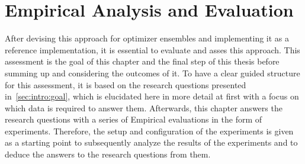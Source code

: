 %
\chapter{Empirical Analysis and Evaluation}
\label{sec:evaluation}
After devising this approach for optimizer ensembles and implementing it as a reference implementation, it is essential to evaluate and asses this approach.
This assessment is the goal of this chapter and the final step of this thesis before summing up and considering the outcomes of it.\newline
To have a clear guided structure for this assessment, it is based on the research questions presented in~\ref{sec:intro:goal}, which is elucidated here in more detail at first with a focus on which data is required to answer them.
Afterwards, this chapter answers the research questions with a series of Empirical evaluations in the form of experiments.\newline
Therefore, the setup and configuration of the experiments is given as a starting point to subsequently analyze the results of the experiments and to deduce the answers to the research questions from them.

